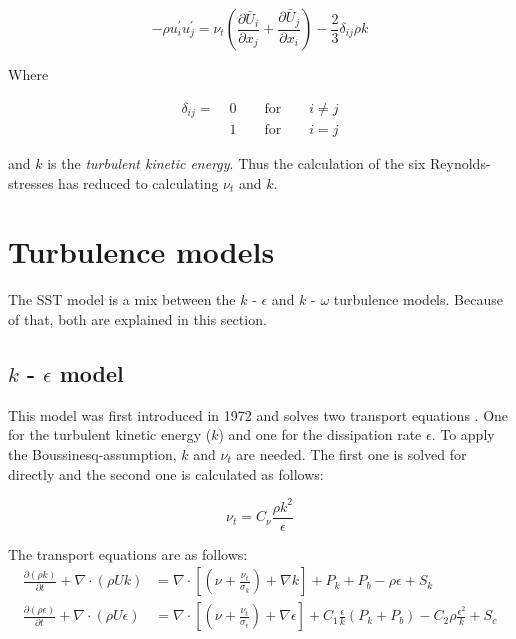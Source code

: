 \begin{equation}
    - \rho u_{i}^{\prime} u_{j}^{\prime} =
    \nu_{t} (\frac{\partial \bar U_{i}}{\partial x_{j}} +
    \frac{\partial \bar U_{j}}{\partial x_{i}}) -
    \frac{2}{3} \delta_{ij} \rho k
    \label{eq:boussinesq}
\end{equation}

\noindent Where

\begin{align*}
    \delta_{ij} = \; &0 \qquad \text{for} \qquad i \neq j \\
    &1 \qquad \text{for} \qquad i = j
\end{align*}

\noindent and $k$ is the \textit{turbulent kinetic energy}. Thus the calculation
of the six Reynolds-stresses has reduced to calculating $\nu_{t}$ and $k$.
\cite{leschziner2015statistical}




\section{Turbulence models}
The SST model is a mix between the $k$ - $\epsilon$ and $k$ - $\omega$
turbulence models. Because of that, both are explained in this section.


\subsection{$k$ - $\epsilon$ model}
This model was first introduced in 1972 and solves two transport equations
.\cite{JONES1972301} One for the turbulent kinetic energy ($k$) and one for the
dissipation rate $\epsilon$. To apply the Boussinesq-assumption, $k$ and
$\nu_t$ are needed. The first one is solved for directly and the second one is
calculated as follows:

\begin{equation}
    \nu_t = C_{\nu} \frac{\rho k^2}{\epsilon}
\end{equation}


\noindent The transport equations are as follows:
\begin{align}
    \frac{\partial (\rho k)}{\partial t} + 
    \nabla \cdot (\rho U k) &=
    \nabla \cdot \left[ 
        \left( \nu + \frac{\nu_t}{\sigma_k}\right) + \nabla k 
    \right] + P_k + P_b - \rho \epsilon + S_k \\
%
    \frac{\partial (\rho \epsilon)}{\partial t} + 
    \nabla \cdot (\rho U \epsilon) &=
    \nabla \cdot \left[ 
        \left( \nu + \frac{\nu_t}{\sigma_{\epsilon}}\right) + \nabla  \epsilon
    \right] + C_1 \frac{\epsilon}{k}(P_k + P_b) - 
    C_2 \rho \frac{\epsilon^2}{k} + S_c
\end{align}

